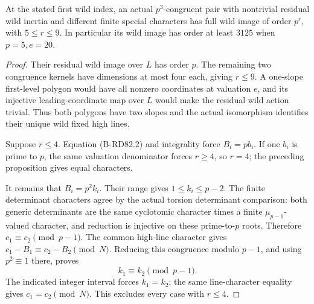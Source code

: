 \begin{theorem}
\label{thm:B-RD82}
At the stated first wild index, an actual \(p^3\)-congruent
pair with nontrivial residual wild inertia and different
finite special characters has full wild image of order
\(p^r\), with \(5\le r\le9\). In particular its wild
image has order at least \(3125\) when \(p=5,e=20\).
\end{theorem}
\begin{proof}
Their residual wild image over \(L\) has order \(p\).
The remaining two congruence kernels have dimensions at
most four each, giving \(r\le9\). A one-slope first-level
polygon would have all nonzero coordinates at valuation
\(e\), and its injective leading-coordinate map over \(L\)
would make the residual wild action trivial. Thus both
polygons have two slopes and the actual isomorphism
identifies their unique wild fixed high lines.

Suppose \(r\le4\). Equation (B-RD82.2) and integrality
force \(B_i=pb_i\). If one \(b_i\) is prime to \(p\),
the same valuation denominator forces \(r\ge4\), so
\(r=4\); the preceding proposition gives equal characters.

It remains that \(B_i=p^2k_i\). Their range gives
\(1\le k_i\le p-2\). The finite determinant characters
agree by the actual torsion determinant comparison: both
generic determinants are the same cyclotomic character
times a finite \(\mu_{p-1}\)-valued character, and reduction
is injective on these prime-to-\(p\) roots. Therefore
\(c_1\equiv c_2\pmod{p-1}\). The common high-line character
gives \(c_1-B_1\equiv c_2-B_2\pmod N\). Reducing this
congruence modulo \(p-1\), and using \(p^2\equiv1\)
there, proves
\[
                 k_1\equiv k_2\pmod{p-1}.             \tag{B-RD82.9}
\]
The indicated integer interval forces \(k_1=k_2\);
the same line-character equality gives \(c_1=c_2\pmod N\).
This excludes every case with \(r\le4\).
\end{proof}

